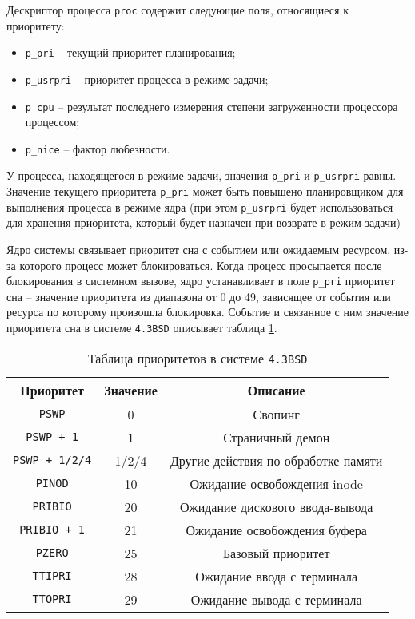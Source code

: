 Дескриптор процесса \texttt{proc} содержит следующие поля, относящиеся к приоритету:
\begin{itemize}
    \item \texttt{p\_pri} – текущий приоритет планирования;
    \item \texttt{p\_usrpri} – приоритет процесса в режиме задачи;
    \item \texttt{p\_cpu} – результат последнего измерения степени
          загруженности процессора процессом;
    \item \texttt{p\_nice} – фактор любезности.
\end{itemize}

У процесса, находящегося в режиме задачи, значения \texttt{p\_pri} и
\texttt{p\_usrpri} равны. Значение текущего приоритета \texttt{p\_pri} может
быть повышено планировщиком для выполнения процесса в режиме ядра (при этом
\texttt{p\_usrpri} будет использоваться для хранения приоритета, который будет
назначен при возврате в режим задачи)

Ядро системы связывает приоритет сна с событием или ожидаемым ресурсом, из-за
которого процесс может блокироваться. Когда процесс просыпается после
блокирования в системном вызове, ядро устанавливает в поле \texttt{p\_pri}
приоритет сна – значение приоритета из диапазона от 0 до 49, зависящее от
события или ресурса по которому произошла блокировка. Событие и связанное с ним
значение приоритета сна в системе \texttt{4.3BSD} описывает таблица
\ref{tab:bsd}.

\begin{table}[h]
    \caption{Таблица приоритетов в системе \texttt{4.3BSD}}
    \label{tab:bsd}
    \begin{center}
        \begin{tabular}{ |c|c|c| }
            \hline
            \textbf{Приоритет} & \textbf{Значение} & \textbf{Описание} \\
            \hline
            \texttt{PSWP} & 0 & Свопинг \\
            \hline
            \texttt{PSWP + 1} & 1 & Страничный демон \\
            \hline
            \texttt{PSWP + 1/2/4} & 1/2/4 & Другие действия по обработке памяти \\
            \hline
            \texttt{PINOD} & 10 & Ожидание освобождения inode \\
            \hline
            \texttt{PRIBIO} & 20 & Ожидание дискового ввода-вывода \\
            \hline
            \texttt{PRIBIO + 1} & 21 & Ожидание освобождения буфера \\
            \hline
            \texttt{PZERO} & 25 & Базовый приоритет \\
            \hline
            \texttt{TTIPRI} & 28 & Ожидание ввода с терминала \\
            \hline
            \texttt{TTOPRI} & 29 & Ожидание вывода с терминала \\
            \hline
        \end{tabular}
    \end{center}
\end{table}

